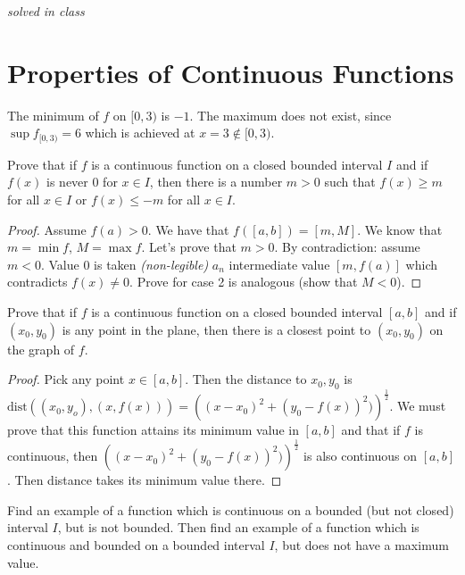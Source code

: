 \documentclass[12pt]{book}
\newenvironment{exercise}[2][Exercise]{\begin{trivlist}
\item[\hskip \labelsep {\bfseries #1}\hskip \labelsep {\bfseries #2.}]}{\end{trivlist}}
\begin{document}
\begin{exercise}{1.4.6}
\begin{exercise}{3.1.12}
\emph{solved in class}
\end{exercise}


\section{Properties of Continuous Functions}

\begin{exercise}{3.2.1}
The minimum of $f$ on $[0, 3)$ is $-1$. The maximum does not exist, since $\sup f_{[0,3)} = 6$ which is achieved at $x=3 \not \in [0,3)$.
\end{exercise}

\begin{exercise}{3.2.2}
    Prove that if $f$ is a continuous function on a closed bounded interval $I$ and if $f(x)$ is never 0 for $x \in I$, then there is a number $m>0$ such that $f(x)\geq m$ for all $x \in I$ or $f(x) \leq -m$ for all $x \in I$.
    
    \begin{proof}
    Assume $f(a)>0$. We have that $f([a,b])=[m,M]$. We know that $m=\min f$, $M=\max f$. Let's prove that $m>0$. By contradiction: assume $m<0$. Value 0 is taken \emph{(non-legible)} $a_n$ intermediate value $[m, f(a)]$ which contradicts $f(x)\neq 0$. Prove for case 2 is analogous (show that $M <0$).
    \end{proof}
\end{exercise}

\begin{exercise}{3.2.3}
    Prove that if $f$ is a continuous function on a closed bounded interval $[a,b]$ and if $(x_0, y_0)$ is any point in the plane, then there is a closest point to $(x_0,y_0)$ on the graph of $f$. 
    
    \begin{proof}
    Pick any point $x \in [a,b]$. Then the distance to $x_0,y_0$ is $\text{dist}\left( (x_0,y_o), (x,f(x)) \right) = \left( (x-x_0)^2 + (y_0-f(x))^2)\right)^{\frac{1}{2}}$. We must prove that this function attains its minimum value in $[a,b]$ and that if $f$ is continuous, then $\left( (x-x_0)^2 + (y_0-f(x))^2)\right)^{\frac{1}{2}}$ is also continuous on $[a,b]$. Then distance takes its minimum value there.
    \end{proof}
\end{exercise}


\begin{exercise}{3.2.4}
Find an example of a function which is continuous on a bounded (but not closed) interval $I$, but is not bounded. Then find an example of a function which is continuous and bounded on a bounded interval $I$, but does not have a maximum value. \\


\end{exercise}
\end{exercise}
\end{document}
